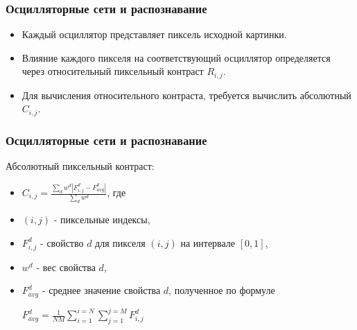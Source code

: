 \documentclass{beamer}
\begin{document}

\begin{frame}
\frametitle{Осцилляторные сети и распознавание}

\begin{itemize}
\item[]Каждый осциллятор представляет пиксель исходной картинки.
\bigskip
\item[]Влияние каждого пикселя на соответствующий осциллятор определяется через относительный пиксельный контраст $R_{i,j}$.
\bigskip
\item[]Для вычисления относительного контраста, требуется вычислить абсолютный $C_{i,j}$.
\end{itemize}


\end{frame}


\begin{frame}
\frametitle{Осцилляторные сети и распознавание}

Абсолютный пиксельный контраст:
\medskip
\begin{itemize}
\item[]
\begin{center}
	$C_{i,j}=\frac{\sum\limits_{d}w^d|F^d_{i,j}-F^d_{avg}|}{\sum\limits_{d}w^d}$, где
\end{center}
\item[] $(i,j)$ - пиксельные индексы,
\item[] $F^d_{i,j}$ - свойство $d$ для пикселя $(i,j)$ на интервале $[0, 1]$,
\item[] $w^d$ - вес свойства $d$,
\item[] $F^d_{avg}$ - среднее значение свойства $d$, полученное по формуле
\begin{center}
	$F^d_{avg}=\frac{1}{NM}\sum\limits_{i=1}^{i=N}\sum\limits_{j=1}^{j=M}F^d_{i,j}$
\end{center}
\end{itemize}
\end{frame}

\end{document}
